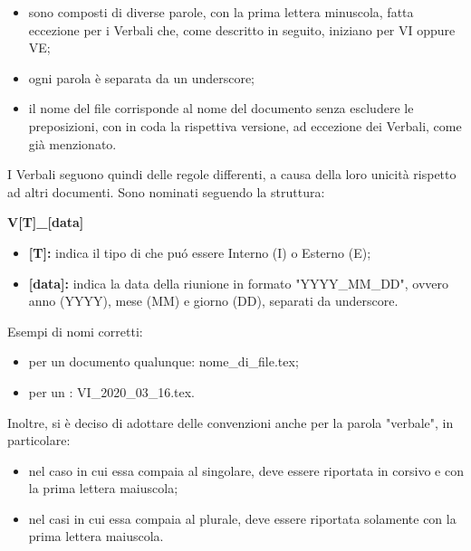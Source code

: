        \begin{itemize}
          \item sono composti di diverse parole, con la prima lettera minuscola, fatta eccezione per i Verbali che, come descritto in seguito, iniziano per VI oppure VE;
          \item ogni parola è separata da un underscore;
          \item il nome del file corrisponde al nome del documento senza escludere le preposizioni, con in coda la rispettiva versione, ad eccezione dei Verbali, come già menzionato.
        \end{itemize}
        I Verbali seguono quindi delle regole differenti, a causa della loro unicità rispetto ad altri documenti. Sono nominati seguendo la struttura:
        \begin{center}
          \textbf{{V[T]\_[data]}}
        \end{center}
        \begin{itemize}
          \item \textbf{[T]:} indica il tipo di \Verbale{} che puó essere Interno (I) o Esterno (E);
          \item \textbf{[data]:} indica la data della riunione in formato "YYYY\_MM\_DD", ovvero anno (YYYY), mese (MM) e giorno (DD), separati da underscore.
        \end{itemize}
        Esempi di nomi corretti:
        \begin{itemize}
          \item per un documento qualunque: nome\_di\_file.tex;
          \item per un \Verbale{}: VI\_2020\_03\_16.tex.
        \end{itemize}
    	\noindent Inoltre, si è deciso di adottare delle convenzioni anche per la parola "verbale", in particolare:
    	\begin{itemize}
    		\item nel caso in cui essa compaia al singolare, deve essere riportata in corsivo e con la prima lettera maiuscola;
    		\item nel casi in cui essa compaia al plurale, deve essere riportata solamente con la prima lettera maiuscola.
    	\end{itemize}

